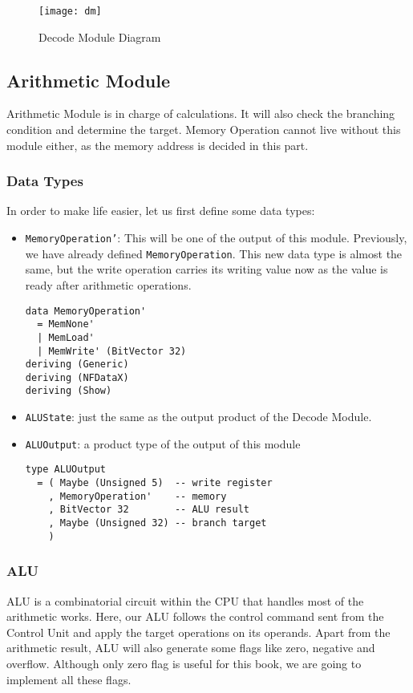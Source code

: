 \begin{figure}[H]
	\centering
	\texttt{[image: dm]}
	\caption{Decode Module Diagram}
\end{figure}
\subsection{Arithmetic Module}
Arithmetic Module is in charge of calculations. It will also check the branching condition and determine the target. Memory Operation cannot live without this module either, as the memory address is decided in this part.
\subsubsection{Data Types}
In order to make life easier, let us first define some data types:
\begin{itemize}
\item \texttt{MemoryOperation'}: This will be one of the output of this module. Previously, we have already defined \texttt{MemoryOperation}. This new data type is almost the same, but the write operation carries its writing value now as the value is ready after arithmetic operations.
\begin{verbatim}
data MemoryOperation'
  = MemNone'
  | MemLoad'
  | MemWrite' (BitVector 32)
deriving (Generic)
deriving (NFDataX)
deriving (Show)
\end{verbatim}
\item  \texttt{ALUState}: just the same as the output product of the Decode Module.
\item  \texttt{ALUOutput}: a product type of the output of this module
\begin{verbatim}
type ALUOutput
  = ( Maybe (Unsigned 5)  -- write register
    , MemoryOperation'    -- memory
    , BitVector 32        -- ALU result
    , Maybe (Unsigned 32) -- branch target
    )
\end{verbatim}
\end{itemize}
\subsubsection{ALU}
ALU is a combinatorial circuit within the CPU that handles most of the arithmetic works. Here, our ALU follows the control command sent from the Control Unit and apply the target operations on its operands. Apart from the arithmetic result, ALU will also generate some flags like zero, negative and overflow. Although only zero flag is useful for this book, we are going to implement all these flags. 

